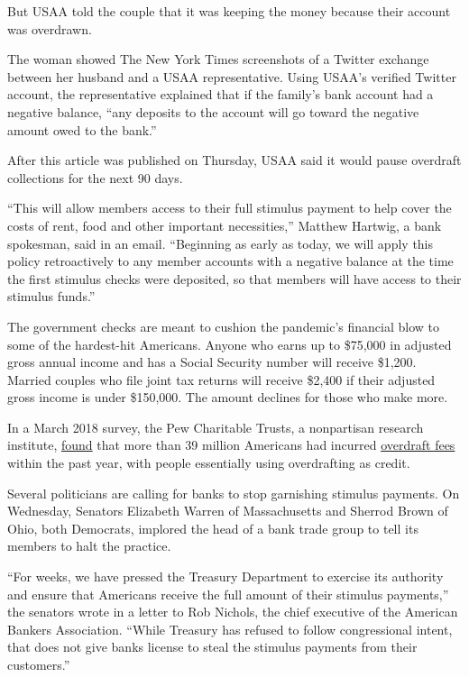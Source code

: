 But USAA told the couple that it was keeping the money because their
account was overdrawn.

The woman showed The New York Times screenshots of a Twitter exchange
between her husband and a USAA representative. Using USAA's verified
Twitter account, the representative explained that if the family's bank
account had a negative balance, ``any deposits to the account will go
toward the negative amount owed to the bank.''

After this article was published on Thursday, USAA said it would pause
overdraft collections for the next 90 days.

``This will allow members access to their full stimulus payment to help
cover the costs of rent, food and other important necessities,'' Matthew
Hartwig, a bank spokesman, said in an email. ``Beginning as early as
today, we will apply this policy retroactively to any member accounts
with a negative balance at the time the first stimulus checks were
deposited, so that members will have access to their stimulus funds.''

The government checks are meant to cushion the pandemic's financial blow
to some of the hardest-hit Americans. Anyone who earns up to \$75,000 in
adjusted gross annual income and has a Social Security number will
receive \$1,200. Married couples who file joint tax returns will receive
\$2,400 if their adjusted gross income is under \$150,000. The amount
declines for those who make more.

In a March 2018 survey, the Pew Charitable Trusts, a nonpartisan
research institute,
\href{https://www.pewtrusts.org/en/research-and-analysis/articles/2018/03/21/millions-use-bank-overdrafts-as-credit}{found}
that more than 39 million Americans had incurred
\href{https://www.nytimes3xbfgragh.onion/2020/06/03/business/banks-overdraft-fees.html}{overdraft
fees} within the past year, with people essentially using overdrafting
as credit.

Several politicians are calling for banks to stop garnishing stimulus
payments. On Wednesday, Senators Elizabeth Warren of Massachusetts and
Sherrod Brown of Ohio, both Democrats, implored the head of a bank trade
group to tell its members to halt the practice.

``For weeks, we have pressed the Treasury Department to exercise its
authority and ensure that Americans receive the full amount of their
stimulus payments,'' the senators wrote in a letter to Rob Nichols, the
chief executive of the American Bankers Association. ``While Treasury
has refused to follow congressional intent, that does not give banks
license to steal the stimulus payments from their customers.''

